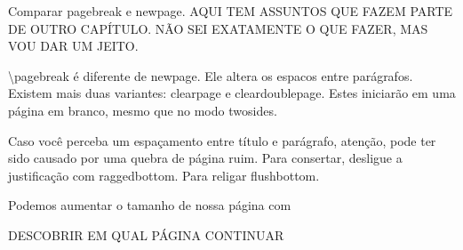 Comparar pagebreak e newpage.
AQUI TEM ASSUNTOS QUE FAZEM PARTE DE OUTRO CAPÍTULO.
NÃO SEI EXATAMENTE O QUE FAZER, MAS VOU DAR UM JEITO.

\textbackslash pagebreak é diferente de newpage. Ele altera os espacos entre parágrafos.
Existem mais duas variantes: clearpage e cleardoublepage.
Estes iniciarão em uma página em branco, mesmo que no modo twosides.

Caso você perceba um espaçamento entre título e parágrafo,
atenção, pode ter sido causado por uma quebra de página ruim.
Para consertar, desligue a justificação com raggedbottom.
Para religar flushbottom.

Podemos aumentar o tamanho de nossa página com 

DESCOBRIR EM QUAL PÁGINA CONTINUAR

\newpage
